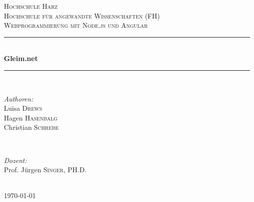 \documentclass[12pt]{article} %
\begin{document}

\begin{titlepage}

\newcommand{\HRule}{\rule{\linewidth}{0.5mm}} %

\center %

\textsc{\LARGE Hochschule Harz\\Hochschule für angewandte Wissenschaften (FH)}\\[1.5cm] %
\textsc{\Large Webprogrammierung mit Node.js und Angular}\\[0.5cm] %

\HRule \\[0.4cm]
{ \huge \bfseries Gleim.net}\\[0.4cm] %
\HRule \\[1.5cm]

\begin{minipage}{0.4\textwidth}
\begin{flushleft} \large
\emph{Authoren:}\\
Luisa \textsc{Drews}\\Hagen \textsc{Hasenbalg}\\ Christian \textsc{Schrebe} %
\end{flushleft}
\end{minipage}
~
\begin{minipage}{0.4\textwidth}
\begin{flushright} \large
\emph{Dozent:} \\
Prof. Jürgen \textsc{Singer}, PH.D. %
\end{flushright}
\end{minipage}\\[4cm]

{\large \today}\\[3cm] %


\vfill %

\end{titlepage}
\end{document}
